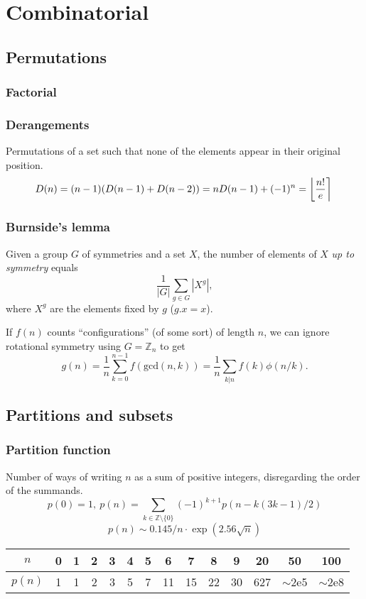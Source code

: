 \chapter{Combinatorial}

\section{Permutations}
	\subsection{Factorial}
		

	\subsection{Derangements}
		Permutations of a set such that none of the elements appear in their original position.
		\[ \mkern-2mu D(n) = (n-1)(D(n-1)+D(n-2)) = n D(n-1)+(-1)^n = \left\lfloor\frac{n!}{e}\right\rceil \]

	\subsection{Burnside's lemma}
		Given a group $G$ of symmetries and a set $X$, the number of elements of $X$ \emph{up to symmetry} equals
		 \[ {\frac {1}{|G|}}\sum _{{g\in G}}|X^{g}|, \]
		 where $X^{g}$ are the elements fixed by $g$ ($g.x = x$).

		 If $f(n)$ counts ``configurations'' (of some sort) of length $n$, we can ignore rotational symmetry using $G = \mathbb Z_n$ to get
		 \[ g(n) = \frac 1 n \sum_{k=0}^{n-1}{f(\text{gcd}(n, k))} = \frac 1 n \sum_{k|n}{f(k)\phi(n/k)}. \]

\section{Partitions and subsets}
	\subsection{Partition function}
		Number of ways of writing $n$ as a sum of positive integers, disregarding the order of the summands.
		\[ p(0) = 1,\ p(n) = \sum_{k \in \mathbb Z \setminus \{0\}}{(-1)^{k+1} p(n - k(3k-1) / 2)} \]
		\[ p(n) \sim 0.145 / n \cdot \exp(2.56 \sqrt{n}) \]

		\begin{center}
		\begin{tabular}{c|c@{\ }c@{\ }c@{\ }c@{\ }c@{\ }c@{\ }c@{\ }c@{\ }c@{\ }c@{\ }c@{\ }c@{\ }c}
			$n$    & 0 & 1 & 2 & 3 & 4 & 5 & 6  & 7  & 8  & 9  & 20  & 50  & 100 \\ \hline
			$p(n)$ & 1 & 1 & 2 & 3 & 5 & 7 & 11 & 15 & 22 & 30 & 627 & $\mathtt{\sim}$2e5 & $\mathtt{\sim}$2e8 \\
		\end{tabular}
		\end{center}

